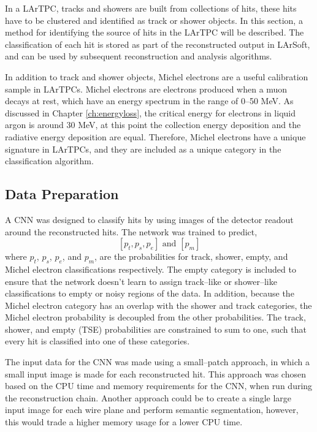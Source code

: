 In a LArTPC, tracks and showers are built from collections of hits, these hits
have to be clustered and identified as track or shower objects. In this section,
a method for identifying the source of hits in the \protodune{} LArTPC will 
be described. The classification of each hit is stored as part of the 
reconstructed output in LArSoft, and can be used by subsequent reconstruction 
and analysis algorithms.

In addition to track and shower objects, Michel electrons are a useful 
calibration sample in LArTPCs. Michel electrons are electrons produced when a 
muon decays at rest, which have an energy spectrum in the range of 0--50 MeV. 
As discussed in Chapter \ref{ch:energyloss}, the critical energy for electrons 
in liquid argon is around 30 MeV, at this point the collection energy deposition 
and the radiative energy deposition are equal. Therefore, Michel electrons 
have a unique signature in LArTPCs, and they are included as a unique category 
in the classification algorithm.

\subsection{Data Preparation}

A CNN was designed to classify hits by using images of the detector readout
around the reconstructed hits. The network was trained to predict,
\begin{equation*}
	\left[ p_t, p_s, p_e \right] \mbox{ and } \left[ p_m \right]
\end{equation*}
where $p_t$, $p_s$, $p_e$, and $p_m$, are the probabilities for track, shower,
empty, and Michel electron classifications respectively. The empty category is
included to ensure that the network doesn't learn to assign track--like or
shower--like classifications to empty or noisy regions of the data. In addition,
because the Michel electron category has an overlap with the shower and track
categories, the Michel electron probability is decoupled from the other 
probabilities. The track, shower, and empty (TSE) probabilities are 
constrained to sum to one, such that every hit is classified into one of these 
categories.

The input data for the CNN was made using a small--patch approach, in
which a small input image is made for each reconstructed hit. This approach was
chosen based on the CPU time and memory requirements for the CNN, when run 
during the \protodune{} reconstruction chain. Another approach could be to 
create a single large input image for each wire plane and perform semantic 
segmentation, however, this would trade a higher memory usage for a lower CPU 
time.

